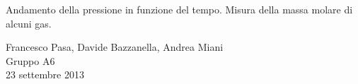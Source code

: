 \begin{center}

	\vspace{0.5cm}
     	{\huge Andamento della pressione in funzione del tempo. Misura della massa molare di alcuni gas.}
	\vspace{0.4cm}

      	{\large Francesco Pasa, Davide Bazzanella, Andrea Miani} \\
		{\large Gruppo A6} \\
	
	\vspace{0.2cm}
      	{\large 23 settembre 2013}

\end{center}
